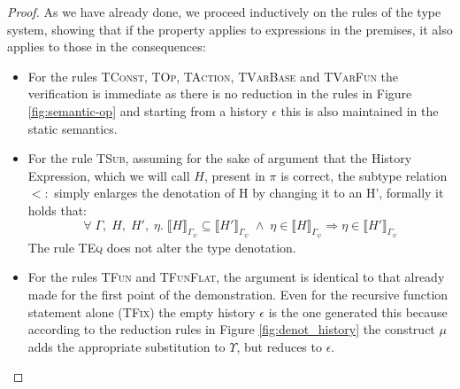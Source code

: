 \begin{proof}
    As we have already done, we proceed inductively on the rules of the type system, showing that if the property applies to expressions in the premises, it also applies to those in the consequences:
    \begin{itemize}
        \item For the rules \textsc{TConst}, \textsc{TOp}, \textsc{TAction}, \textsc{TVarBase} and \textsc{TVarFun} the verification is immediate as there is no reduction in the rules in Figure \ref{fig:semantic-op} and starting from a history $\epsilon$ this is also maintained in the static semantics.
        \item For the rule \textsc{TSub}, assuming for the sake of argument that the History Expression, which we will call $H$, present in $\pi$ is correct, the subtype relation $<:$ simply enlarges the denotation of H by changing it to an H', formally it holds that:
        \begin{equation}
            \forall \;\Gamma, \;H, \;H', \;\eta. \;\llbracket H \rrbracket_{\Gamma_{\psi}} \subseteq \llbracket H'\rrbracket_{\Gamma_{\psi}} \;\land\; \eta \in \llbracket H \rrbracket_{\Gamma_{\psi}} \Longrightarrow \eta \in \llbracket H' \rrbracket_{\Gamma_{\psi}}
        \end{equation}
        The rule \textsc{TEq} does not alter the type denotation.
        \item For the rules \textsc{TFun} and \textsc{TFunFlat}, the argument is identical to that already made for the first point of the demonstration. Even for the recursive function statement alone (\textsc{TFix}) the empty history $\epsilon$ is the one generated this because according to the reduction rules in Figure \ref{fig:denot_history} the construct $\mu$ adds the appropriate substitution to $\Upsilon$, but reduces to $\epsilon$.

\end{itemize}
\end{proof}
